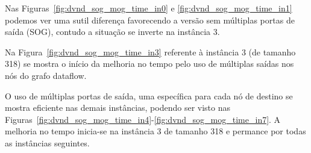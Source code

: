 
Nas Figuras~\ref{fig:dvnd_sog_mog_time_in0} e \ref{fig:dvnd_sog_mog_time_in1} podemos ver uma sutil diferença favorecendo a versão sem múltiplas portas de saída (SOG), contudo a situação se inverte na instância 3.



Na Figura~\ref{fig:dvnd_sog_mog_time_in3} referente à instância 3 (de tamanho 318) se mostra o início da melhoria no tempo pelo uso de múltiplas saídas nos nós do grafo dataflow.


O uso de múltiplas portas de saída, uma específica para cada nó de destino se mostra eficiente nas demais instâncias, podendo ser visto nas Figuras~\ref{fig:dvnd_sog_mog_time_in4}-\ref{fig:dvnd_sog_mog_time_in7}.
A melhoria no tempo inicia-se na instância 3 de tamanho 318 e permance por todas as instâncias seguintes.



